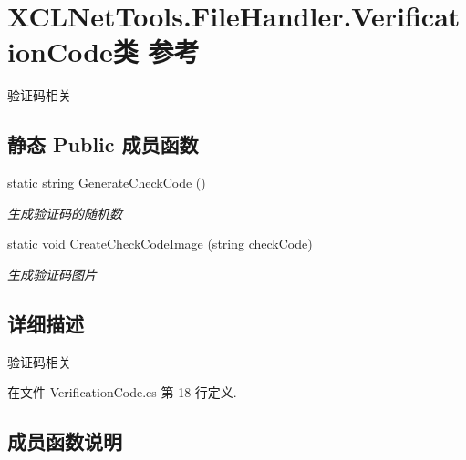 \hypertarget{class_x_c_l_net_tools_1_1_file_handler_1_1_verification_code}{}\section{X\+C\+L\+Net\+Tools.\+File\+Handler.\+Verification\+Code类 参考}
\label{class_x_c_l_net_tools_1_1_file_handler_1_1_verification_code}


验证码相关  


\subsection*{静态 Public 成员函数}
\begin{DoxyCompactItemize}
\item 
static string \hyperlink{class_x_c_l_net_tools_1_1_file_handler_1_1_verification_code_af4beced22b07b395e6ae37452a895f32}{Generate\+Check\+Code} ()
\begin{DoxyCompactList}\small\item\em 生成验证码的随机数 \end{DoxyCompactList}\item 
static void \hyperlink{class_x_c_l_net_tools_1_1_file_handler_1_1_verification_code_acde0d83935e0d55da7a29725026a72e9}{Create\+Check\+Code\+Image} (string check\+Code)
\begin{DoxyCompactList}\small\item\em 生成验证码图片 \end{DoxyCompactList}\end{DoxyCompactItemize}


\subsection{详细描述}
验证码相关 



在文件 Verification\+Code.\+cs 第 18 行定义.



\subsection{成员函数说明}
\mbox{\label{class_x_c_l_net_tools_1_1_file_handler_1_1_verification_code_acde0d83935e0d55da7a29725026a72e9}} 
